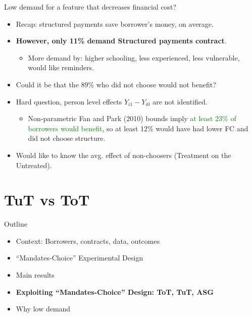 \documentclass[9pt, aspectratio=169]{beamer}
\begin{document}
\begin{frame}{Low demand for a feature that decreases financial cost?}
    \begin{itemize}
        \item Recap: structured payments save borrower's money, on average.
        \vfill \item  \textbf{However, only 11\% demand Structured payments contract}.
        \begin{itemize}
            \item More demand by: higher schooling, less experienced, less vulnerable, would like reminders.
        \end{itemize}
        \vfill\item Could it be that the 89\% \alert{who did not choose} would not benefit?
        \vfill\item Hard question, person level effects  $Y_{i1} - Y_{i0}$ are not identified.
        \begin{itemize}
            \item Non-parametric Fan and Park (2010) bounds imply \textcolor{green}{at least 23\% of borrowers would benefit}, so at least 12\% would have had lower FC and did not choose structure. 
        \end{itemize}
        \vfill\item Would like to know the avg. effect of non-choosers (\alert{Treatment on the Untreated}). 
    \end{itemize}
\end{frame}



\section{TuT vs ToT}

\begin{frame}{Outline}
     \large   
     \begin{itemize}
        \item Context: Borrowers, contracts, data, outcomes
         \item \vfill ``Mandates-Choice'' Experimental Design
         \vfill\item Main results
          \vfill\item \textbf{Exploiting ``Mandates-Choice'' Design: ToT, TuT, ASG}
         \vfill\item Why low demand
         
     \end{itemize}
\end{frame}
\end{document}
